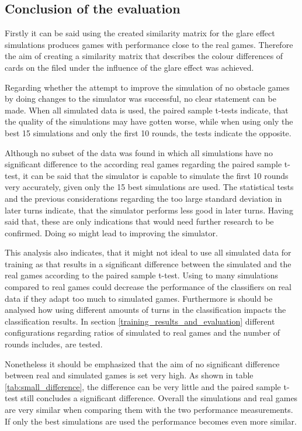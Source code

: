 \subsection{Conclusion of the evaluation}
\label{conclusion_of_the_evaluation}
Firstly it can be said using the created similarity matrix for the glare effect simulations produces games with performance close to the real games. Therefore the aim of creating a similarity matrix that describes the colour differences of cards on the filed under the influence of the glare effect was achieved. 

Regarding whether the attempt to improve the simulation of no obstacle games by doing changes to the simulator was successful, no clear statement can be made. When all simulated data is used, the paired sample t-tests indicate, that the quality of the simulations may have gotten worse, while when using only the best 15 simulations and only the first 10 rounds, the tests indicate the opposite. 

Although no subset of the data was found in which all simulations have no significant difference to the according real games regarding the paired sample t-test, it can be said that the simulator is capable to simulate the first 10 rounds very accurately, given only the 15 best simulations are used. The statistical tests and the previous considerations regarding the too large standard deviation in later turns indicate, that the simulator performs less good in later turns. Having said that, these are only indications that would need further research to be confirmed. Doing so might lead to improving the simulator. 

This analysis also indicates, that it might not ideal to use all simulated data for training as that results in a significant difference between the simulated and the real games according to the paired sample t-test. Using to many simulations compared to real games could decrease the performance of the classifiers on real data if they adapt too much to simulated games. Furthermore is should be analysed how using different amounts of turns in the classification impacts the classification results. In section \ref{training_results_and_evaluation}  different configurations regarding ratios of simulated to real games and the number of rounds includes, are tested. 

Nonetheless it should be emphasized that the aim of no significant difference between real and simulated games is set very high. As shown in table \ref{tab:small_difference}, the difference can be very little and the paired sample t-test still concludes a significant difference. Overall the simulations and real games are very similar when comparing them with the two performance measurements. If only the best simulations are used the performance becomes even more similar.  

